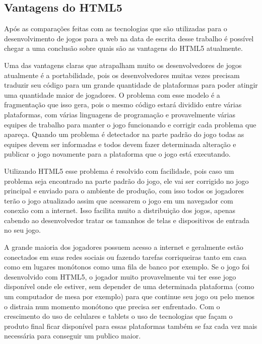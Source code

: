 \subsection{Vantagens do HTML5}
Após as comparações feitas com as tecnologias que são utilizadas para
o desenvolvimento de jogos para a web na data de escrita desse
trabalho é possível chegar a uma conclusão sobre quais são
as vantagens do HTML5 atualmente.

Uma das vantagens claras que atrapalham muito os desenvolvedores de
jogos atualmente é a portabilidade, pois os desenvolvedores muitas
vezes precisam traduzir seu código para um grande quantidade de
plataformas para poder atingir uma quantidade maior de jogadores. O
problema com esse modelo é a fragmentação que isso gera, pois o mesmo
código estará dividido entre várias plataformas, com várias linguagens
de programação e provavelmente várias equipes de trabalho para manter
o jogo funcionando e corrigir cada problema que apareça. Quando um
problema é detectador na parte padrão do jogo todas as equipes devem
ser informadas e todos devem fazer determinada alteração e publicar o
jogo novamente para a plataforma que o jogo está executando.

Utilizando HTML5 esse problema é resolvido com facilidade, pois caso
um problema seja encontrado na parte padrão do jogo, ele vai ser
corrigido no jogo principal e enviado para o ambiente de produção, com
isso todos os jogadores terão o jogo atualizado assim que acessarem o
jogo em um navegador com conexão com a internet. Isso facilita muito a
distribuição dos jogos, apenas cabendo ao desenvolvedor tratar os
tamanhos de telas e dispositivos de entrada no seu jogo.

A grande maioria dos jogadores possuem acesso a internet e geralmente
estão conectados em suas redes sociais ou fazendo tarefas corriqueiras
tanto em casa como em lugares monótonos como uma fila de banco por
exemplo. Se o jogo foi desenvolvido com HTML5, o jogador muito
provavelmente vai ter esse jogo disponível onde ele estiver, sem
depender de uma determinada plataforma (como um computador de mesa por
exemplo) para que continue seu jogo ou pelo menos o distraia num
momento monótono que precisa ser enfrentado. Com o crescimento do uso
de celulares e tablets o uso de tecnologias que façam o produto final
ficar disponível para essas plataformas também se faz cada vez mais
necessária para conseguir um publico maior.

